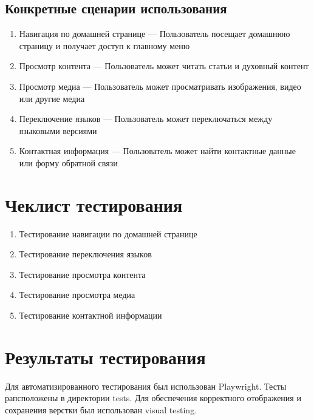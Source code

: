 \subsection{Конкретные сценарии использования}
\begin{enumerate}
    \item Навигация по домашней странице — Пользователь посещает домашнюю страницу и получает доступ к главному меню
    \item Просмотр контента — Пользователь может читать статьи и духовный контент
    \item Просмотр медиа — Пользователь может просматривать изображения, видео или другие медиа
    \item Переключение языков — Пользователь может переключаться между языковыми версиями
    \item Контактная информация — Пользователь может найти контактные данные или форму обратной связи
\end{enumerate}

\section{Чеклист тестирования}

\begin{enumerate}
    \item Тестирование навигации по домашней странице
    \item Тестирование переключения языков
    \item Тестирование просмотра контента
    \item Тестирование просмотра медиа
    \item Тестирование контактной информации
\end{enumerate}

\section{Результаты тестирования}

Для автоматизированного тестирования был использован Playwright.
Тесты рапсположены в директории tests.
Для обеспечения корректного отображения и сохранения верстки был использован visual testing.
